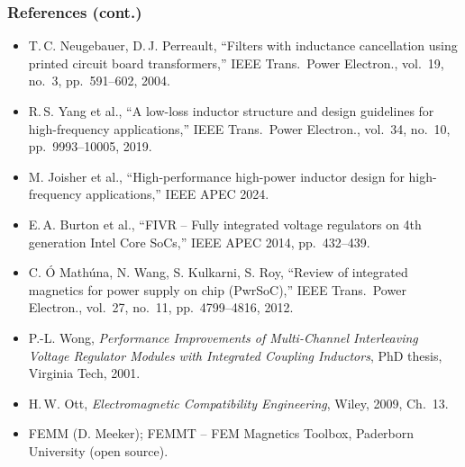 \begin{frame}
	\frametitle{References (cont.)}
	\scriptsize
	\begin{itemize}
		\item T.\,C. Neugebauer, D.\,J. Perreault, ``Filters with inductance cancellation using printed circuit board transformers,'' IEEE Trans.\ Power Electron., vol.\ 19, no.\ 3, pp.\ 591--602, 2004.
		\item R.\,S. Yang et al., ``A low-loss inductor structure and design guidelines for high-frequency applications,'' IEEE Trans.\ Power Electron., vol.\ 34, no.\ 10, pp.\ 9993--10005, 2019.
		\item M. Joisher et al., ``High-performance high-power inductor design for high-frequency applications,'' IEEE APEC 2024.
		\item E.\,A. Burton et al., ``FIVR -- Fully integrated voltage regulators on 4th generation Intel Core SoCs,'' IEEE APEC 2014, pp.\ 432--439.
		\item C. \'O Math\'una, N. Wang, S. Kulkarni, S. Roy, ``Review of integrated magnetics for power supply on chip (PwrSoC),'' IEEE Trans.\ Power Electron., vol.\ 27, no.\ 11, pp.\ 4799--4816, 2012.
		\item P.-L. Wong, \textit{Performance Improvements of Multi-Channel Interleaving Voltage Regulator Modules with Integrated Coupling Inductors}, PhD thesis, Virginia Tech, 2001.
		\item H.\,W. Ott, \textit{Electromagnetic Compatibility Engineering}, Wiley, 2009, Ch.\ 13.
		\item FEMM (D. Meeker); FEMMT -- FEM Magnetics Toolbox, Paderborn University (open source).
	\end{itemize}
\end{frame}

